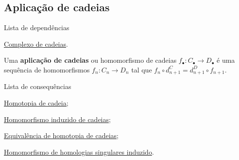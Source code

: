 \subsection{Aplicação de cadeias}
\label{aplicacao-de-cadeias-def}
\begin{titlemize}{Lista de dependências}
	\item \hyperref[complexo-de-cadeias-def]{Complexo de cadeias}.\\ %
\end{titlemize}

\begin{defi}
    Uma \textbf{aplicação de cadeias} ou homomorfismo de cadeias $f_\bullet:C_\bullet\rightarrow D_\bullet$ é uma sequência de homomorfismos $f_n:C_n\rightarrow D_n$ tal que $f_n\circ d_{n+1}^C=d_{n+1}^D\circ f_{n+1}$.
\end{defi}

\begin{titlemize}{Lista de consequências}
    \item \hyperref[homotopia-de-cadeias-def]{Homotopia de cadeia;}\\
    \item \hyperref[homomorfismo-induzido-de-cadeias-prop]{Homomorfismo induzido de cadeias};\\
    \item \hyperref[equivalencia-de-homotopia-de-cadeias-def]{Equivalência de homotopia de cadeias};\\
    \item \hyperref[homomorfismo-de-homologias-singulares-induzido-prop]{Homomorfismo de homologias singulares induzido}.
\end{titlemize}
